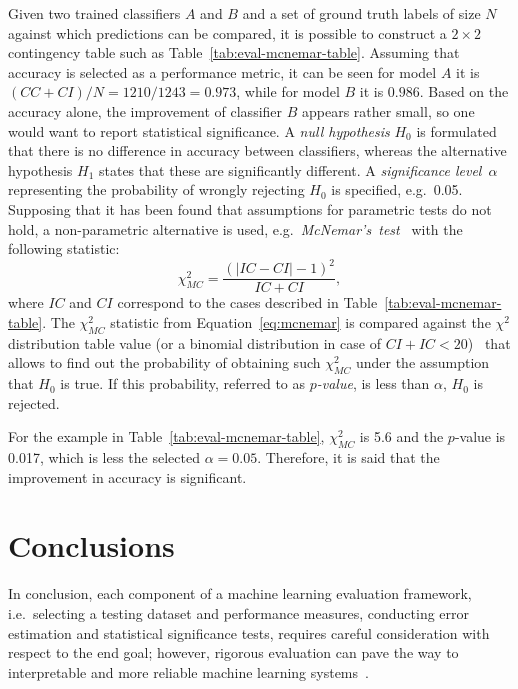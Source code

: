 %
Given two trained classifiers $A$ and $B$ and a set of ground truth labels of size $N$ against which predictions can be compared, it is possible to construct a $2\times 2$ contingency table such as Table~\ref{tab:eval-mcnemar-table}.
Assuming that accuracy is selected as a performance metric, it can be seen for model $A$ it is $(CC + CI) / N = 1210 / 1243 = 0.973$, while for model $B$ it is $0.986$.
Based on the accuracy alone, the improvement of classifier $B$ appears rather small, so one would want to report statistical significance.
A \emph{null hypothesis} $H_0$ is formulated that there is no difference in accuracy between classifiers, whereas the alternative hypothesis $H_1$ states that these are significantly different.
A \emph{significance level}~$\alpha$ representing the probability of wrongly rejecting $H_0$ is specified, e.g.\ 0.05.
Supposing that it has been found that assumptions for parametric tests do not hold, a non-parametric alternative is used, e.g.~\emph{McNemar's~test}~\citep{Mcnemar1947} with the following statistic:
\begin{equation}
    \label{eq:mcnemar}
    \chi^2_{MC} = \frac{(\lvert IC - CI  \rvert - 1)^2}{IC + CI},
\end{equation}
where $IC$ and $CI$ correspond to the cases described in Table~\ref{tab:eval-mcnemar-table}.
%
The $\chi^2_{MC}$ statistic from Equation~\ref{eq:mcnemar} is compared against the $\chi^2$ distribution table value (or a binomial distribution in case of $CI + IC < 20$)~\citep{Japkowic2011} that allows to find out the probability of obtaining such $\chi^2_{MC}$ under the assumption that $H_0$ is true.
%
If this probability, referred to as \emph{$p$-value}, is less than $\alpha$, $H_0$ is rejected.

For the example in Table~\ref{tab:eval-mcnemar-table}, $\chi^2_{MC}$ is 5.6 and the $p$-value is 0.017, which is less the selected $\alpha=0.05$. Therefore, it is said that the improvement in accuracy is significant.

\section{Conclusions}
In conclusion, each component of a machine learning evaluation framework, i.e.\ selecting a testing dataset and performance measures, conducting error estimation and statistical significance tests,
requires careful consideration with respect to the end goal; however, rigorous evaluation can pave the way to interpretable and more reliable machine learning systems~\citep{Doshi2017}.


